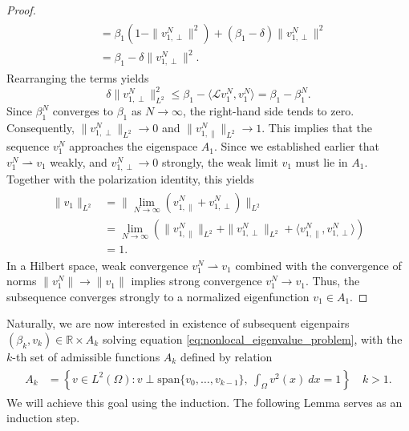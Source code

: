 \documentclass[11pt, a4paper]{article}
\theoremstyle{break}
\theoremstyle{break}
\theoremstyle{break}
\theoremstyle{break}
\theoremstyle{break}
\theoremstyle{break}
\theoremstyle{break}
\theoremstyle{break}
\theoremstyle{break}
\theoremstyle{break}
\begin{document}
\begin{proof}
\begin{align}
\begin{split}
            &= \beta_1 (1 - \|v_{1, \perp}^{N}\|^2) + (\beta_1 - \delta) \|v_{1, \perp}^{N}\|^2 \\
            &= \beta_1 - \delta \|v_{1, \perp}^{N}\|^2.
        \end{split}
    \end{align}
    Rearranging the terms yields
    \begin{equation}
        \delta \|v_{1, \perp}^{N}\|_{L^2}^2 \leq \beta_1 - \langle \mathcal{L} v_1^N, v_1^N \rangle = \beta_1 - \beta_1^N.
    \end{equation}
    Since $\beta_1^N$ converges to $\beta_1$ as $N \to \infty$, the right-hand side tends to zero. Consequently, $\|v_{1, \perp}^{N}\|_{L^2} \to 0$ and $\|v_{1, \parallel}^{N}\|_{L^2} \to 1$. This implies that the sequence $v_1^N$ approaches the eigenspace $A_1$.  Since we established earlier that $v_1^N \rightharpoonup v_1$ weakly, and $v_{1, \perp}^{N} \to 0$ strongly, the weak limit $v_1$ must lie in $A_1$. Together with the polarization identity, this yields
    \begin{align}
        \begin{split}
            \|v_1\|_{L^2} 
            &= 
            \|\lim_{N \to \infty} (v_{1, \parallel}^{N} + v_{1, \perp}^N)\|_{L^2} \\
            &=
            \lim_{N \to \infty} \left(\|v_{1, \parallel}^{N}\|_{L^2} + \| v_{1, \perp}^N\|_{L^2} + \langle v_{1, \parallel}^N, v_{1, \perp}^N \rangle \right) \\
            &=
            1.
        \end{split}
    \end{align}
    In a Hilbert space, weak convergence $v_1^N \rightharpoonup v_1$ combined with the convergence of norms $\|v_1^N\| \to \|v_1\|$ implies strong convergence $v_1^N \to v_1$. Thus, the subsequence converges strongly to a normalized eigenfunction $v_1 \in A_1$.
\end{proof}

Naturally, we are now interested in existence of subsequent eigenpairs $(\beta_k, v_k) \in \mathbb{R}\times A_k$ solving equation \eqref{eq:nonlocal_eigenvalue_problem}, with the $k$-th set of admissible functions $A_k$ defined by relation
\begin{align}
    \begin{split}
        A_k &= \left\{ v \in L^2(\Omega): v \perp \text{span}\{v_0, \ldots, v_{k-1}\}, \: \int_\Omega v^2(x) \: dx = 1 \right\} \quad k > 1.
    \end{split}
\end{align}
We will achieve this goal using the induction. The following Lemma serves as an induction step.
\end{document}

